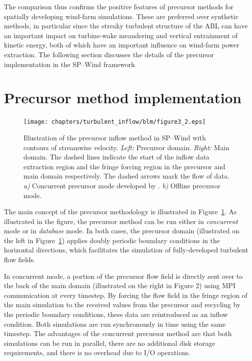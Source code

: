 	The comparison thus confirms the positive features of precursor methods for spatially developing wind-farm simulations. These are preferred over synthetic methods, in particular since the streaky turbulent structure of the ABL can have an important impact on turbine-wake meandering and vertical entrainment of kinetic energy, both of which have an important influence on wind-farm power extraction. The following section discusses the details of the precursor implementation in the SP--Wind framework.
	
\section{Precursor method implementation}\label{sec:inflow_CP}	
\begin{figure}
	\centering
	\texttt{[image: chapters/turbulent\_inflow/blm/figure3\_2.eps]}
	\caption[Illustration of the precursor inflow method in SP--Wind with contours of streamwise velocity.]{Illustration of the precursor inflow method in SP--Wind with contours of streamwise velocity. \textit{Left:} Precursor domain. \textit{Right: } Main domain. The dashed lines indicate the start of the inflow data extraction region and the fringe forcing region in the precursor and main domain respectively. The dashed arrows mark the flow of data. \emph{a)} Concurrent precursor mode developed by \cite{stevens2014concurrent}. \emph{b)} Offline precursor mode. \label{fig:CP0}}	
\end{figure}

The main concept of the precursor methodology is illustrated in Figure~\ref{fig:CP0}. As illustrated in the figure, the precursor method can be run either in \emph{concurrent} mode \citep{stevens2014concurrent} or in \emph{database} mode. In both cases, the precursor domain (illustrated on the left in Figure~\ref{fig:CP0}) applies doubly periodic boundary conditions in the horizontal directions, which facilitates the simulation of fully-developed turbulent flow fields. 

In concurrent mode, a portion of the precursor flow field is directly sent over to the back of the main domain (illustrated on the right in Figure 2) using MPI communication at every timestep. By forcing the flow field in the fringe region of the main simulation to the received values from the precursor and recycling by the periodic boundary conditions, these data are reintroduced as an inflow condition. Both simulations are run synchronously in time using the same timestep. The advantages of the concurrent precursor method are that both simulations can be run in parallel, there are no additional disk storage requirements, and there is no overhead due to I/O operations.

